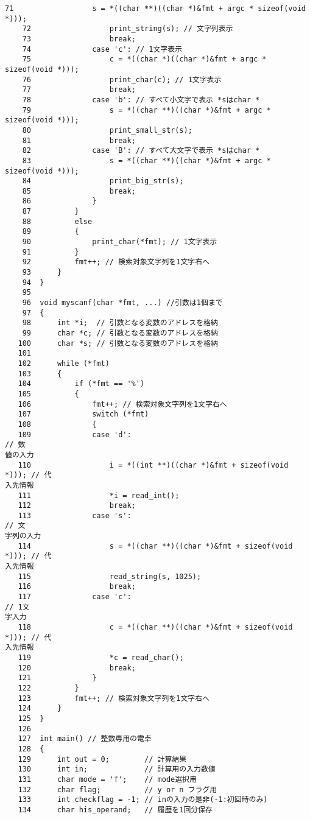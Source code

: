 \begin{Verbatim}[fontsize=\small, baselinestretch=0.8]
    71	                s = *((char **)((char *)&fmt + argc * sizeof(void *)));
    72	                print_string(s); // 文字列表示
    73	                break;
    74	            case 'c': // 1文字表示
    75	                c = *((char *)((char *)&fmt + argc * sizeof(void *)));
    76	                print_char(c); // 1文字表示
    77	                break;
    78	            case 'b': // すべて小文字で表示 *sはchar *
    79	                s = *((char **)((char *)&fmt + argc * sizeof(void *)));
    80	                print_small_str(s);
    81	                break;
    82	            case 'B': // すべて大文字で表示 *sはchar *
    83	                s = *((char **)((char *)&fmt + argc * sizeof(void *)));
    84	                print_big_str(s);
    85	                break;
    86	            }
    87	        }
    88	        else
    89	        {
    90	            print_char(*fmt); // 1文字表示
    91	        }
    92	        fmt++; // 検索対象文字列を1文字右へ
    93	    }
    94	}
    95	
    96	void myscanf(char *fmt, ...) //引数は1個まで
    97	{
    98	    int *i;  // 引数となる変数のアドレスを格納
    99	    char *c; // 引数となる変数のアドレスを格納
   100	    char *s; // 引数となる変数のアドレスを格納
   101	
   102	    while (*fmt)
   103	    {
   104	        if (*fmt == '%')
   105	        {
   106	            fmt++; // 検索対象文字列を1文字右へ
   107	            switch (*fmt)
   108	            {
   109	            case 'd':                                           // 数
値の入力
   110	                i = *((int **)((char *)&fmt + sizeof(void *))); // 代
入先情報
   111	                *i = read_int();
   112	                break;
   113	            case 's':                                            // 文
字列の入力
   114	                s = *((char **)((char *)&fmt + sizeof(void *))); // 代
入先情報
   115	                read_string(s, 1025);
   116	                break;
   117	            case 'c':                                            // 1文
字入力
   118	                c = *((char **)((char *)&fmt + sizeof(void *))); // 代
入先情報
   119	                *c = read_char();
   120	                break;
   121	            }
   122	        }
   123	        fmt++; // 検索対象文字列を1文字右へ
   124	    }
   125	}
   126	
   127	int main() // 整数専用の電卓
   128	{
   129	    int out = 0;        // 計算結果
   130	    int in;             // 計算用の入力数値
   131	    char mode = 'f';    // mode選択用
   132	    char flag;          // y or n フラグ用
   133	    int checkflag = -1; // inの入力の是非(-1:初回時のみ)
   134	    char his_operand;   // 履歴を1回分保存

\end{Verbatim}
